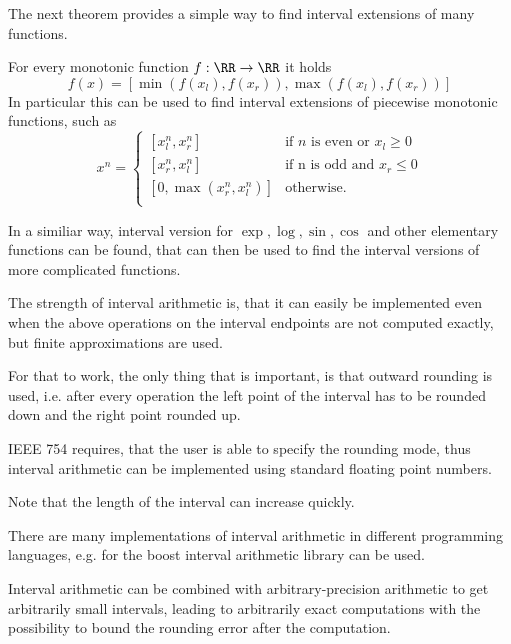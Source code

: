 	The next theorem provides a simple way to find interval extensions of many functions.
	\begin{theorem}
		For every monotonic function $f: \RR \to \RR$ it holds
		$$ f(x) = [\min(f(x_l), f(x_r)), \max(f(x_l), f(x_r))] $$
		In particular this can be used to find interval extensions of piecewise monotonic functions, such as
		\begin{equation}
			x^n  =   
				\begin{cases} 
					[x_l^n, x_r^n] &\mbox{if } n \mbox{ is even or } x_l \geq 0 \\
					[x_r^n, x_l^n] &\mbox{if n is odd and } x_r \leq 0 \\
					[0, \max(x_r^n, x_l^n)] & \mbox{otherwise.}  \\
				\end{cases} 
		\end{equation} 
	\end{theorem}
	In a similiar way, interval version for $\exp, \log, \sin, \cos$ and other elementary functions can be found, 
	that can then be used to find the interval versions of more complicated functions.

	The strength of interval arithmetic is, that it can easily be implemented even when the above 
	operations on the interval endpoints are not computed exactly, but finite approximations are used.
	
	For that to work, the only thing that is important, is that outward rounding is used, i.e. 
	after every operation the left point of the interval has to be rounded down and the right point rounded up.

	IEEE 754 requires, that the user is able to specify the rounding mode, thus interval arithmetic can be implemented 
	using standard floating point numbers.

	Note that the length of the interval can increase quickly.

	There are many implementations of interval arithmetic in different programming languages, e.g. 
	for \cc the boost interval arithmetic library can be used.

  Interval arithmetic can be combined with arbitrary-precision arithmetic to
  get arbitrarily small intervals, leading to arbitrarily exact computations
  with the possibility to bound the rounding error after the computation.

